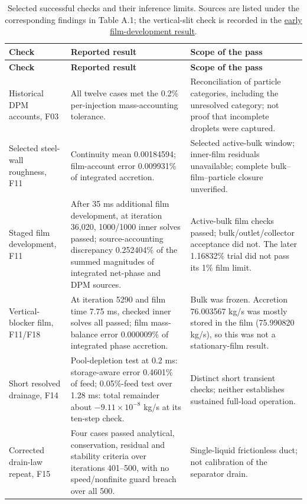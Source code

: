 \begin{longtable}{@{}>{\raggedright\arraybackslash}p{0.29000000\dimexpr\linewidth-4\tabcolsep\relax}>{\raggedright\arraybackslash}p{0.34000000\dimexpr\linewidth-4\tabcolsep\relax}>{\raggedright\arraybackslash}p{0.37000000\dimexpr\linewidth-4\tabcolsep\relax}@{}}
\caption{Selected successful checks and their inference limits. Sources are listed under the corresponding findings in Table A.1; the vertical-slit check is recorded in the \href{https://github.com/Shuhei-uni/P4P_knowledgeWiki/blob/main/Project/experiments/phase-10-proposed-design/vertical-slit154k/startup-stage3/film-development/results.md}{early film-development result}.}\label{tab:table-B.1}\\
\toprule
\textbf{Check} & \textbf{Reported result} & \textbf{Scope of the pass} \\
\midrule
\endfirsthead
\toprule
\textbf{Check} & \textbf{Reported result} & \textbf{Scope of the pass} \\
\midrule
\endhead
Historical DPM accounts, F03 & All twelve cases met the 0.2\% per-injection mass-accounting tolerance. & Reconciliation of particle categories, including the unresolved category; not proof that incomplete droplets were captured. \\
Selected steel-wall roughness, F11 & Continuity mean 0.00184594; film-account error 0.009931\% of integrated accretion. & Selected active-bulk window; inner-film residuals unavailable; complete bulk--film--particle closure unverified. \\
Staged film development, F11 & After 35 ms additional film development, at iteration 36,020, 1000/1000 inner solves passed; source-accounting discrepancy 0.252404\% of the summed magnitudes of integrated net-phase and DPM sources. & Active-bulk film checks passed; bulk/outlet/collector acceptance did not. The later 1.16832\% trial did not pass its 1\% film limit. \\
Vertical-blocker film, F11/F18 & At iteration 5290 and film time 7.75 ms, checked inner solves all passed; film mass-balance error 0.000009\% of integrated phase accretion. & Bulk was frozen. Accretion 76.003567 kg/s was mostly stored in the film (75.990820 kg/s), so this was not a stationary-film result. \\
Short resolved drainage, F14 & Pool-depletion test at 0.2 ms: storage-aware error 0.4601\% of feed; 0.05\%-feed test over 1.28 ms: total remainder about \(-9.11 \times 10^{-8}\) kg/s at its ten-step check. & Distinct short transient checks; neither establishes sustained full-load operation. \\
Corrected drain-law repeat, F15 & Four cases passed analytical, conservation, residual and stability criteria over iterations 401--500, with no speed/nonfinite guard breach over all 500. & Single-liquid frictionless duct; not calibration of the separator drain. \\
\bottomrule
\end{longtable}

